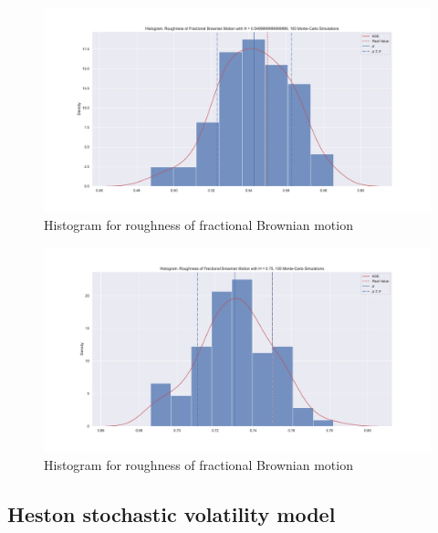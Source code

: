             \begin{figure}
                \centering
                \includegraphics[width=\linewidth]{fig/Histogram. Roughness of Fractional Brownian Motion with H = 0.55, 100 Monte-Carlo Simulations.pdf}
                \caption{Histogram for roughness of fractional Brownian motion}
            \end{figure}
            \begin{figure}
                \centering
                \includegraphics[width=\linewidth]{fig/Histogram. Roughness of Fractional Brownian Motion with H = 0.75, 100 Monte-Carlo Simulations.pdf}
                \caption{Histogram for roughness of fractional Brownian motion}
            \end{figure}

    \subsection{Heston stochastic volatility model}

